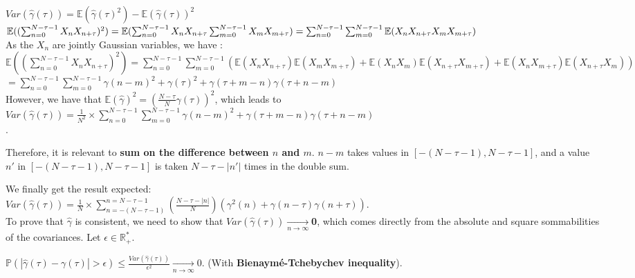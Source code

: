 \documentclass[11pt]{article}
\begin{document}
\begin{solution}


$Var(\hat{\gamma}(\tau)) = \mathbb{E}(\hat{\gamma}(\tau)^2) - \mathbb{E}(\hat{\gamma}(\tau))^2$\\[1cm]
$\mathbb{E}((\sum_{n=0}^{N-\tau-1}  X_n X_{n+\tau})^2)  =\mathbb{E} (\sum_{n=0}^{N-\tau-1} X_n X_{n+\tau} \sum_{m=0}^{N-\tau-1} X_m X_{m+\tau}) \\
= \sum_{n=0}^{N-\tau-1} \sum_{m=0}^{N-\tau-1} \mathbb{E}(X_n X_{n+\tau} X_m X_{m+\tau})$\\
As the $X_n$ are jointly Gaussian variables, we have  :\\

$\mathbb{E}((\sum_{n=0}^{N-\tau-1}  X_n X_{n+\tau})^2) = \sum_{n=0}^{N-\tau-1} \sum_{m=0}^{N-\tau-1} (\mathbb{E}(X_n X_{n+\tau}) \mathbb{E}(X_m X_{m+\tau}) + \mathbb{E}(X_n X_m) \mathbb{E}(X_{n+\tau} X_{m+\tau}) + \mathbb{E}(X_n X_{m+\tau}) \mathbb{E}(X_{n+\tau} X_m))$\\
$=\sum_{n=0}^{N-\tau-1} \sum_{m=0}^{N-\tau-1} \gamma(n-m)^2 + \gamma(\tau)^2 + \gamma(\tau + m - n ) \gamma(\tau + n - m ) $\\

However, we have that $\mathbb{E}(\hat{\gamma})^2 = (\frac{N- \tau}{N} \gamma(\tau))^2$, which leads to \\

$Var(\hat{\gamma}(\tau)) = \frac{1}{N^2} \times \sum_{n=0}^{N-\tau-1} \sum_{m=0}^{N-\tau-1} \gamma(n-m)^2 + \gamma(\tau + m - n ) \gamma(\tau + n - m ) $\\. 

Therefore, it is relevant to \textbf{sum on the difference between $n$ and $m$}. 
$n-m$ takes values in $[-(N-\tau-1), N-\tau-1]$, and a value $n'$ in $[-(N-\tau-1), N-\tau-1]$ is taken $N - \tau - |n'|$ times in the double sum. 

We finally get the result expected: \\

$Var(\hat{\gamma}(\tau)) = \frac{1}{N} \times \sum_{n=-(N-\tau-1)}^{n=N-\tau-1} \left( \frac{N - \tau - |n|}{N}\right) \left(\gamma^2(n) + \gamma(n-\tau)\gamma(n+\tau)\right).$ \\


To prove that $\hat{\gamma}$ is consistent, we need to show that \textbf{$Var(\hat{\gamma}(\tau)) \xrightarrow[n \to \infty]{}$0}, which comes directly from the absolute and square sommabilities of the covariances. 
Let $\epsilon \in \mathbb{R}^*_+$. 

$\mathbb{P}(|\hat{\gamma}(\tau) - \gamma(\tau)| > \epsilon) \leq \frac{Var(\hat{\gamma}(\tau))}{\epsilon^2}\xrightarrow[ n \to \infty]{} $0. (With \textbf{Bienaymé-Tchebychev inequality}).





\end{solution}
\end{document}
